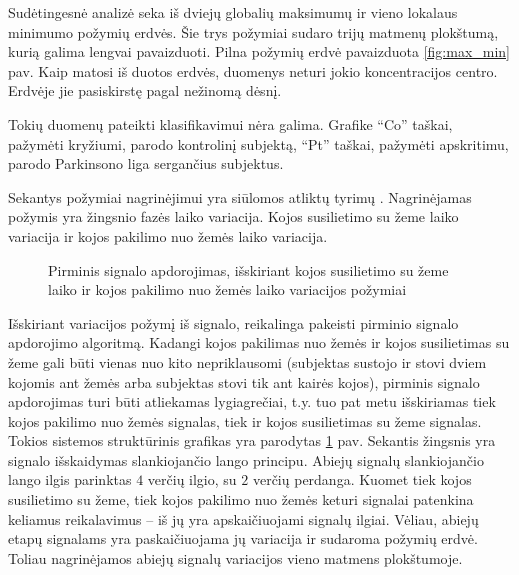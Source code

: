 \documentclass[]{vgtuef}
\begin{document}
Sudėtingesnė analizė seka iš dviejų globalių maksimumų ir vieno lokalaus minimumo požymių erdvės. Šie trys požymiai sudaro trijų matmenų plokštumą, kurią galima lengvai pavaizduoti. Pilna požymių erdvė pavaizduota \ref{fig:max_min} pav. Kaip matosi iš duotos erdvės, duomenys neturi jokio koncentracijos centro. Erdvėje jie pasiskirstę pagal nežinomą dėsnį.

Tokių duomenų pateikti klasifikavimui nėra galima. Grafike ``Co'' taškai, pažymėti kryžiumi, parodo kontrolinį subjektą, ``Pt'' taškai, pažymėti apskritimu, parodo Parkinsono liga sergančius subjektus.

Sekantys požymiai nagrinėjimui yra siūlomos atliktų tyrimų \cite{16053531,KNUTSSON01011972,Delval_Salleron_Bourriez_Bleuse_Moreau_Krystkowiak_Defebvre_Devos_Duhamel_2008}. Nagrinėjamas požymis yra žingsnio fazės laiko variacija. Kojos susilietimo su žeme laiko variacija ir kojos pakilimo nuo žemės laiko variacija.

\begin{figure}[H]
  \centering
  
  \caption{Pirminis signalo apdorojimas, išskiriant kojos susilietimo su žeme laiko ir kojos pakilimo nuo žemės laiko variacijos požymiai}
  \label{fig:stance_swing_extract}
\end{figure}

Išskiriant variacijos požymį iš signalo, reikalinga pakeisti pirminio signalo apdorojimo algoritmą. Kadangi kojos pakilimas nuo žemės ir kojos susilietimas su žeme gali būti vienas nuo kito nepriklausomi (subjektas sustojo ir stovi dviem kojomis ant žemės arba subjektas stovi tik ant kairės kojos), pirminis signalo apdorojimas turi būti atliekamas lygiagrečiai, t.y. tuo pat metu išskiriamas tiek kojos pakilimo nuo žemės signalas, tiek ir kojos susilietimas su žeme signalas. Tokios sistemos struktūrinis grafikas yra parodytas \ref{fig:stance_swing_extract} pav. Sekantis žingsnis yra signalo išskaidymas slankiojančio lango principu. Abiejų signalų slankiojančio lango ilgis parinktas $4$ verčių ilgio, su $2$ verčių perdanga. Kuomet tiek kojos susilietimo su žeme, tiek kojos pakilimo nuo žemės keturi signalai patenkina keliamus reikalavimus -- iš jų yra apskaičiuojami signalų ilgiai. Vėliau, abiejų etapų signalams yra paskaičiuojama jų variacija ir sudaroma požymių erdvė. Toliau nagrinėjamos abiejų signalų variacijos vieno matmens plokštumoje.
\end{document}
